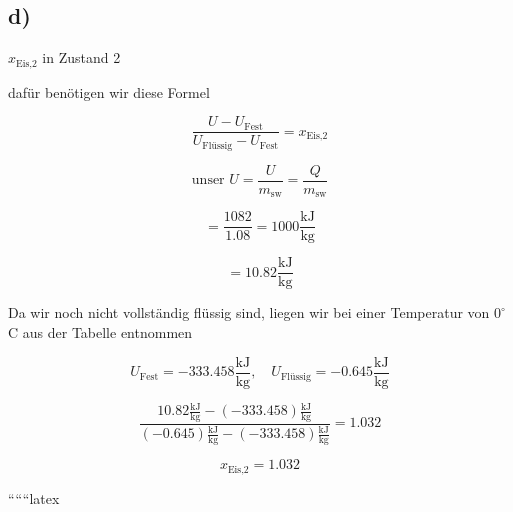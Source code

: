 

\subsection*{d)}
$x_{\text{Eis,2}}$ in Zustand 2

dafür benötigen wir diese Formel

\[
\frac{U - U_{\text{Fest}}}{U_{\text{Flüssig}} - U_{\text{Fest}}} = x_{\text{Eis,2}}
\]

\[
\text{unser } U = \frac{U}{m_{\text{sw}}} = \frac{Q}{m_{\text{sw}}}
\]

\[
= \frac{1082}{1.08} = 1000 \frac{\text{kJ}}{\text{kg}}
\]

\[
= 10.82 \frac{\text{kJ}}{\text{kg}}
\]

Da wir noch nicht vollständig flüssig sind, liegen wir bei einer Temperatur von $0^\circ$C aus der Tabelle entnommen

\[
U_{\text{Fest}} = -333.458 \frac{\text{kJ}}{\text{kg}}, \quad U_{\text{Flüssig}} = -0.645 \frac{\text{kJ}}{\text{kg}}
\]


\[
\frac{10.82 \frac{\text{kJ}}{\text{kg}} - (-333.458) \frac{\text{kJ}}{\text{kg}}}{(-0.645) \frac{\text{kJ}}{\text{kg}} - (-333.458) \frac{\text{kJ}}{\text{kg}}} = 1.032
\]


\[
x_{\text{Eis,2}} = 1.032
\]

``````latex
